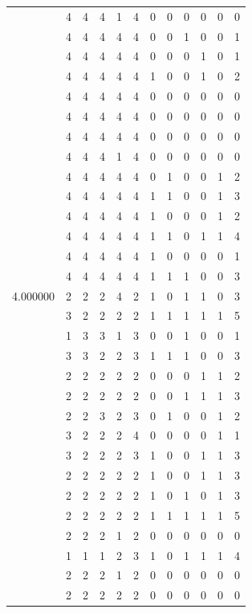 \documentclass[]{book}
\theoremstyle{definition}
\theoremstyle{definition}
\theoremstyle{definition}
\theoremstyle{remark}
\begin{document}
\begin{table}
{\begin{tabular}[t]{rrrrrrrrrrrr}
 & 4 & 4 & 4 & 1 & 4 & 0 & 0 & 0 & 0 & 0 & 0\\
 & 4 & 4 & 4 & 4 & 4 & 0 & 0 & 1 & 0 & 0 & 1\\
 & 4 & 4 & 4 & 4 & 4 & 0 & 0 & 0 & 1 & 0 & 1\\
 & 4 & 4 & 4 & 4 & 4 & 1 & 0 & 0 & 1 & 0 & 2\\
 & 4 & 4 & 4 & 4 & 4 & 0 & 0 & 0 & 0 & 0 & 0\\
 & 4 & 4 & 4 & 4 & 4 & 0 & 0 & 0 & 0 & 0 & 0\\
 & 4 & 4 & 4 & 4 & 4 & 0 & 0 & 0 & 0 & 0 & 0\\
 & 4 & 4 & 4 & 1 & 4 & 0 & 0 & 0 & 0 & 0 & 0\\
 & 4 & 4 & 4 & 4 & 4 & 0 & 1 & 0 & 0 & 1 & 2\\
 & 4 & 4 & 4 & 4 & 4 & 1 & 1 & 0 & 0 & 1 & 3\\
 & 4 & 4 & 4 & 4 & 4 & 1 & 0 & 0 & 0 & 1 & 2\\
 & 4 & 4 & 4 & 4 & 4 & 1 & 1 & 0 & 1 & 1 & 4\\
 & 4 & 4 & 4 & 4 & 4 & 1 & 0 & 0 & 0 & 0 & 1\\
 & 4 & 4 & 4 & 4 & 4 & 1 & 1 & 1 & 0 & 0 & 3\\
4.000000 & 2 & 2 & 2 & 4 & 2 & 1 & 0 & 1 & 1 & 0 & 3\\
 & 3 & 2 & 2 & 2 & 2 & 1 & 1 & 1 & 1 & 1 & 5\\
 & 1 & 3 & 3 & 1 & 3 & 0 & 0 & 1 & 0 & 0 & 1\\
 & 3 & 3 & 2 & 2 & 3 & 1 & 1 & 1 & 0 & 0 & 3\\
 & 2 & 2 & 2 & 2 & 2 & 0 & 0 & 0 & 1 & 1 & 2\\
 & 2 & 2 & 2 & 2 & 2 & 0 & 0 & 1 & 1 & 1 & 3\\
 & 2 & 2 & 3 & 2 & 3 & 0 & 1 & 0 & 0 & 1 & 2\\
 & 3 & 2 & 2 & 2 & 4 & 0 & 0 & 0 & 0 & 1 & 1\\
 & 3 & 2 & 2 & 2 & 3 & 1 & 0 & 0 & 1 & 1 & 3\\
 & 2 & 2 & 2 & 2 & 2 & 1 & 0 & 0 & 1 & 1 & 3\\
 & 2 & 2 & 2 & 2 & 2 & 1 & 0 & 1 & 0 & 1 & 3\\
 & 2 & 2 & 2 & 2 & 2 & 1 & 1 & 1 & 1 & 1 & 5\\
 & 2 & 2 & 2 & 1 & 2 & 0 & 0 & 0 & 0 & 0 & 0\\
 & 1 & 1 & 1 & 2 & 3 & 1 & 0 & 1 & 1 & 1 & 4\\
 & 2 & 2 & 2 & 1 & 2 & 0 & 0 & 0 & 0 & 0 & 0\\
 & 2 & 2 & 2 & 2 & 2 & 0 & 0 & 0 & 0 & 0 & 0\\

\end{tabular}}
\end{table}
\end{document}
